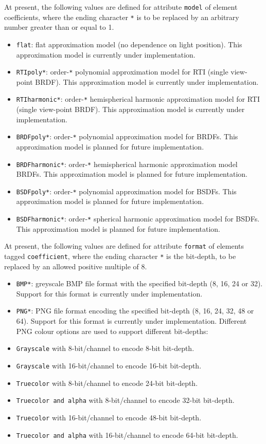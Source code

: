 At present, the following values are defined for attribute
\texttt{model} of element coefficients, where the ending character
\texttt{*} is to be replaced by an arbitrary number greater than or
equal to 1.
\begin{itemize}
\item \texttt{flat}: flat approximation model (no dependence on
light position). This approximation model is currently under
implementation.
\item \texttt{RTIpoly*}: order-\texttt{*} polynomial
approximation model for RTI (single view-point BRDF). This approximation
model is currently under implementation.
\item \texttt{RTIharmonic*}:
order-\texttt{*} hemispherical harmonic approximation model for RTI
(single view-point BRDF). This approximation model is currently under
implementation.
\item \texttt{BRDFpoly*}: order-\texttt{*} polynomial
approximation model for BRDFs. This approximation model is planned for
future implementation.
\item \texttt{BRDFharmonic*}: order-\texttt{*}
hemispherical harmonic approximation model BRDFs. This approximation
model is planned for future implementation.
\item \texttt{BSDFpoly*}:
order-\texttt{*} polynomial approximation model for BSDFs. This
approximation model is planned for future implementation.
\item \texttt{BSDFharmonic*}: order-\texttt{*} spherical harmonic
approximation model for BSDFs. This approximation model is planned for
future implementation.
\end{itemize}

At present, the following values are defined for attribute
\texttt{format} of elements tagged \texttt{coefficient}, where the
ending character \texttt{*} is the bit-depth, to be replaced by an
allowed positive multiple of 8.
\begin{itemize}
\item \texttt{BMP*}: greyscale BMP file
format with the specified bit-depth (8, 16, 24 or 32). Support for this
format is currently under implementation.
\item \texttt{PNG*}: PNG file
format encoding the specified bit-depth (8, 16, 24, 32, 48 or 64).
Support for this format is currently under implementation. Different PNG
colour options are used to support different bit-depths:
\item \texttt{Grayscale} with 8-bit/channel to encode 8-bit bit-depth.
\item \texttt{Grayscale} with 16-bit/channel to encode 16-bit bit-depth.
\item \texttt{Truecolor} with 8-bit/channel to encode 24-bit bit-depth.
\item \texttt{Truecolor\ and\ alpha} with 8-bit/channel to encode 32-bit
bit-depth.
\item \texttt{Truecolor} with 16-bit/channel to encode 48-bit
bit-depth.
\item \texttt{Truecolor\ and\ alpha} with 16-bit/channel to
encode 64-bit bit-depth.
\end{itemize}


